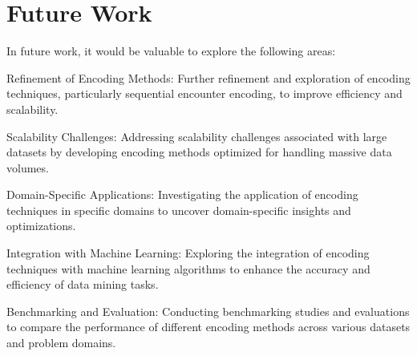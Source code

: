 \section{Future Work}
In future work, it would be valuable to explore the following areas:

Refinement of Encoding Methods: Further refinement and exploration of encoding techniques, particularly sequential encounter encoding, to improve efficiency and scalability.

Scalability Challenges: Addressing scalability challenges associated with large datasets by developing encoding methods optimized for handling massive data volumes.

Domain-Specific Applications: Investigating the application of encoding techniques in specific domains to uncover domain-specific insights and optimizations.

Integration with Machine Learning: Exploring the integration of encoding techniques with machine learning algorithms to enhance the accuracy and efficiency of data mining tasks.

Benchmarking and Evaluation: Conducting benchmarking studies and evaluations to compare the performance of different encoding methods across various datasets and problem domains.